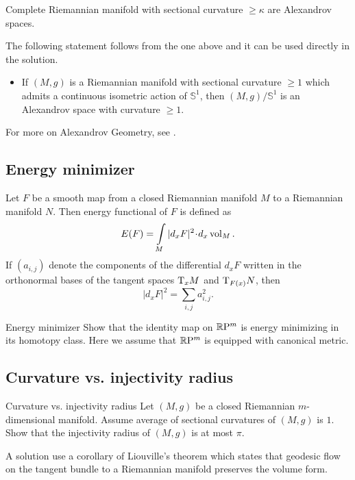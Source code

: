 Complete Riemannian manifold with sectional curvature $\ge \kappa$ are Alexandrov spaces.

The following statement follows from the one above 
and it can be used directly in the solution.
\begin{itemize}
\item If $(M,g)$ is a Riemannian manifold with sectional curvature $\ge 1$ which admits a continuous isometric action of $\mathbb S^1$, 
then $(M,g)/\mathbb S^1$ is an Alexandrov space with curvature $\ge 1$.
\end{itemize}
For more on Alexandrov Geometry, see \cite{akp}.\qeds

\subsection*{Energy minimizer}

Let $F$ be a smooth map from a closed Riemannian manifold $M$ to a Riemannian manifold $N$.
Then energy functional of $F$ is defined as
\[E(F)=\int\limits_M |d_xF|^2\cdot d_x\vol_M.\]
If $(a_{i,j})$ denote the components 
of the differential $d_xF$ 
written in the orthonormal bases of the tangent spaces $\mathrm{T}_xM$ and $\mathrm{T}_{F(x)}N$,
then 
\[|d_xF|^2=\sum_{i,j}a_{i,j}^2.\]

\begin{pr}{}{Energy minimizer}\label{Energy minimizer}
Show that the identity map on $\mathbb{R}\mathrm{P}^m$ is 
energy
minimizing in its homotopy class.
Here we assume that $\mathbb{R}\mathrm{P}^m$ is equipped with canonical metric.
\end{pr}

\subsection*{Curvature vs. injectivity radius\thm}

\begin{pr}{\thm}{Curvature vs. injectivity radius}\label{scalar-curv} 
Let $(M,g)$ be a closed 
Riemannian $m$-dimensional manifold.
Assume average of sectional curvatures of $(M,g)$ is $1$. 
Show that the injectivity radius of $(M,g)$ is at most $\pi$.
\end{pr}

A solution use a corollary of Liouville's theorem 
which states that geodesic flow on the tangent bundle to a Riemannian manifold preserves the volume form.

